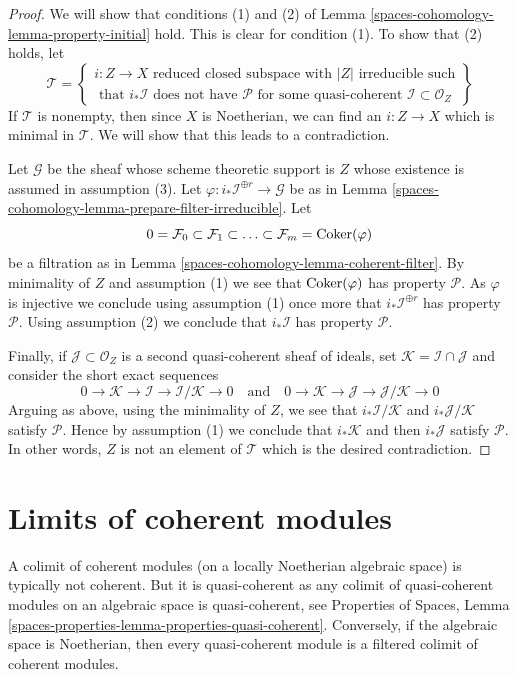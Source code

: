 \begin{proof}
We will show that conditions (1) and (2) of
Lemma \ref{spaces-cohomology-lemma-property-initial} hold. This is clear for condition (1).
To show that (2) holds, let
$$
\mathcal{T} =
\left\{
\begin{matrix}
i : Z \to X \text{ reduced closed subspace with }|Z|\text{ irreducible such}\\
\text{ that }i_*\mathcal{I}\text{ does not have }\mathcal{P}
\text{ for some quasi-coherent }\mathcal{I} \subset \mathcal{O}_Z
\end{matrix}
\right\}
$$
If $\mathcal{T}$ is nonempty, then since $X$ is Noetherian, we can
find an $i : Z \to X$ which is minimal in $\mathcal{T}$. We will show
that this leads to a contradiction.

\medskip\noindent
Let $\mathcal{G}$ be the sheaf whose scheme theoretic support is $Z$ whose
existence is assumed in assumption (3). Let
$\varphi : i_*\mathcal{I}^{\oplus r} \to \mathcal{G}$ be as in
Lemma \ref{spaces-cohomology-lemma-prepare-filter-irreducible}. Let
$$
0 = \mathcal{F}_0 \subset \mathcal{F}_1 \subset
\ldots \subset \mathcal{F}_m = \operatorname{Coker}(\varphi)
$$
be a filtration as in Lemma \ref{spaces-cohomology-lemma-coherent-filter}. By minimality
of $Z$ and assumption (1) we see that $\operatorname{Coker}(\varphi)$ has
property $\mathcal{P}$. As $\varphi$ is injective we conclude using
assumption (1) once more that $i_*\mathcal{I}^{\oplus r}$ has property
$\mathcal{P}$. Using assumption (2) we conclude that $i_*\mathcal{I}$
has property $\mathcal{P}$.

\medskip\noindent
Finally, if $\mathcal{J} \subset \mathcal{O}_Z$ is a second quasi-coherent
sheaf of ideals, set $\mathcal{K} = \mathcal{I} \cap \mathcal{J}$
and consider the short exact sequences
$$
0 \to \mathcal{K} \to \mathcal{I} \to \mathcal{I}/\mathcal{K} \to 0
\quad
\text{and}
\quad
0 \to \mathcal{K} \to \mathcal{J} \to \mathcal{J}/\mathcal{K} \to 0
$$
Arguing as above, using the minimality of $Z$, we see that
$i_*\mathcal{I}/\mathcal{K}$ and $i_*\mathcal{J}/\mathcal{K}$
satisfy $\mathcal{P}$. Hence by assumption (1) we conclude that
$i_*\mathcal{K}$ and then $i_*\mathcal{J}$ satisfy $\mathcal{P}$.
In other words, $Z$ is not an element of $\mathcal{T}$ which is
the desired contradiction.
\end{proof}

\section{Limits of coherent modules}
\label{spaces-cohomology-section-limits}
A colimit of coherent modules (on a locally Noetherian
algebraic space) is typically not coherent. But it is quasi-coherent
as any colimit of quasi-coherent modules on an algebraic space is
quasi-coherent, see Properties of Spaces, Lemma
\ref{spaces-properties-lemma-properties-quasi-coherent}.
Conversely, if the algebraic space is Noetherian, then every quasi-coherent
module is a filtered colimit of coherent modules.


